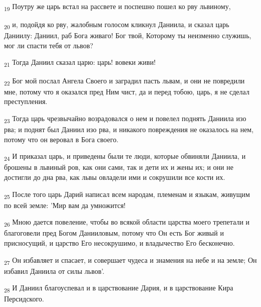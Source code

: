 \begin{tcolorbox}
\textsubscript{19} Поутру же царь встал на рассвете и поспешно пошел ко рву львиному,
\end{tcolorbox}
\begin{tcolorbox}
\textsubscript{20} и, подойдя ко рву, жалобным голосом кликнул Даниила, и сказал царь Даниилу: Даниил, раб Бога живаго! Бог твой, Которому ты неизменно служишь, мог ли спасти тебя от львов?
\end{tcolorbox}
\begin{tcolorbox}
\textsubscript{21} Тогда Даниил сказал царю: царь! вовеки живи!
\end{tcolorbox}
\begin{tcolorbox}
\textsubscript{22} Бог мой послал Ангела Своего и заградил пасть львам, и они не повредили мне, потому что я оказался пред Ним чист, да и перед тобою, царь, я не сделал преступления.
\end{tcolorbox}
\begin{tcolorbox}
\textsubscript{23} Тогда царь чрезвычайно возрадовался о нем и повелел поднять Даниила изо рва; и поднят был Даниил изо рва, и никакого повреждения не оказалось на нем, потому что он веровал в Бога своего.
\end{tcolorbox}
\begin{tcolorbox}
\textsubscript{24} И приказал царь, и приведены были те люди, которые обвиняли Даниила, и брошены в львиный ров, как они сами, так и дети их и жены их; и они не достигли до дна рва, как львы овладели ими и сокрушили все кости их.
\end{tcolorbox}
\begin{tcolorbox}
\textsubscript{25} После того царь Дарий написал всем народам, племенам и языкам, живущим по всей земле: 'Мир вам да умножится!
\end{tcolorbox}
\begin{tcolorbox}
\textsubscript{26} Мною дается повеление, чтобы во всякой области царства моего трепетали и благоговели пред Богом Данииловым, потому что Он есть Бог живый и присносущий, и царство Его несокрушимо, и владычество Его бесконечно.
\end{tcolorbox}
\begin{tcolorbox}
\textsubscript{27} Он избавляет и спасает, и совершает чудеса и знамения на небе и на земле; Он избавил Даниила от силы львов'.
\end{tcolorbox}
\begin{tcolorbox}
\textsubscript{28} И Даниил благоуспевал и в царствование Дария, и в царствование Кира Персидского.
\end{tcolorbox}
